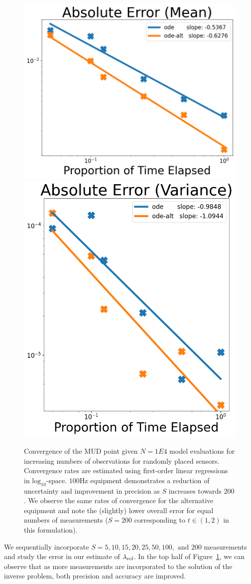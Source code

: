 \begin{figure}[htbp]
  \centering
  \includegraphics[width=0.475\linewidth]{figures/ode/ode_convergence_mud_obs_mean}
  \includegraphics[width=0.425\linewidth]{figures/ode/ode_convergence_mud_obs_var}

  \caption{Convergence of the MUD point given $N=1E4$ model evaluations for increasing numbers of observations for randomly placed sensors.
  Convergence rates are estimated using first-order linear regressions in $\text{log}_{10}$-space.
  $100$Hz equipment demonstrates a reduction of uncertainty and improvement in precision as $S$ increases towards $200$.
  We observe the same rates of convergence for the alternative equipment and note the (slightly) lower overall error for equal numbers of measurements ($S=200$ corresponding to $t\in (1,2)$ in this formulation).
  }
  \label{fig:ode-convergence-obs}
\end{figure}
We sequentially incorporate $S=5, 10, 15, 20, 25, 50, 100, \text{ and } 200$ measurements and study the error in our estimate of $\lambda_\text{ref}$.
In the top half of Figure~\ref{fig:ode-convergence-obs}, we can observe that as more measurements are incorporated to the solution of the inverse problem, both precision and accuracy are improved.



